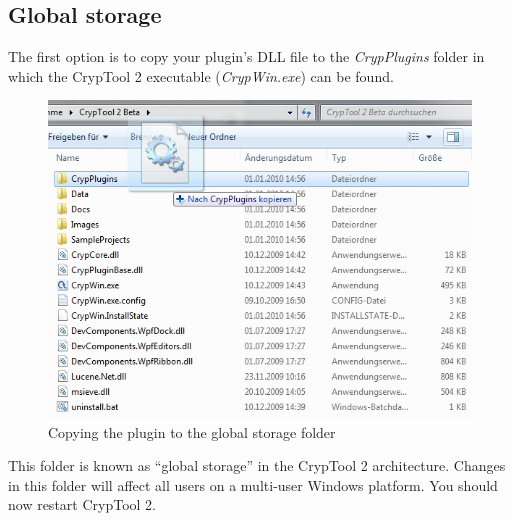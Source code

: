 \subsection{Global storage}
\label{sec:GlobalStorage}

The first option is to copy your plugin's DLL file to the \textit{CrypPlugins} folder in which the CrypTool 2 executable (\textit{CrypWin.exe}) can be found.

\begin{figure}[h]
	\centering
		\includegraphics{figures/copy_dll_global_storage.jpg}
	\caption{Copying the plugin to the global storage folder}
	\label{fig:copy_dll_global_storage}
\end{figure}

This folder is known as ``global storage'' in the CrypTool 2 architecture. Changes in this folder will affect all users on a multi-user Windows platform. You should now restart CrypTool 2.
\clearpage


